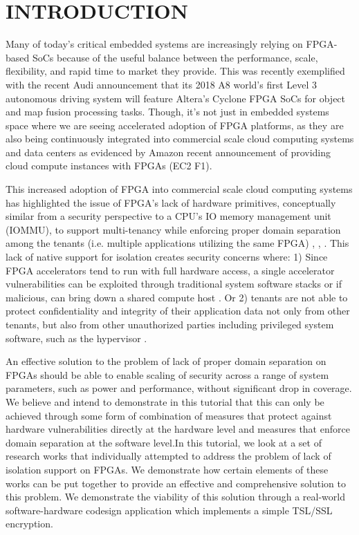 \documentclass[sigconf]{acmart}
\theoremstyle{plain}
\theoremstyle{remark}
\begin{document}
\maketitle


\section{INTRODUCTION}\label{sec:intro}
Many of today's critical embedded systems are increasingly relying on FPGA-based SoCs because of the useful balance between the performance, scale, flexibility, and rapid time to market they provide. This was recently exemplified with the recent Audi announcement that its 2018 A8 world's first Level 3 autonomous driving system will feature Altera's Cyclone FPGA SoCs for object and map fusion processing tasks. Though, it's not just in embedded systems space where we are seeing accelerated adoption of FPGA platforms, as they are also being continuously integrated into commercial scale cloud computing systems and data centers as evidenced by Amazon recent announcement of providing cloud compute instances with FPGAs (EC2 F1).

This increased adoption of FPGA into commercial scale cloud computing systems has highlighted the issue of FPGA's lack of hardware primitives, conceptually similar from a security perspective to a CPU's IO memory management unit (IOMMU), to support multi-tenancy while enforcing proper domain separation among the tenants (i.e. multiple applications utilizing the same FPGA) \cite{CloudFPGA}, \cite{CapslHOST}, \cite{Byma2014FPGAsIT}. This lack of native support for isolation creates security concerns where: 1) Since FPGA accelerators tend to run with full hardware access, a single accelerator vulnerabilities can be exploited through traditional system software stacks or if malicious, can bring down a shared compute host \cite{CloudFPGA}. Or 2) tenants are not able to protect confidentiality and integrity of their application  data not only from other tenants, but also from other unauthorized parties including privileged system software, such as the hypervisor \cite{sconee}.

An effective solution to the problem of lack of proper domain separation on FPGAs should be able to enable scaling of security across a range of system parameters, such as power and performance, without significant drop in coverage. We believe and intend to demonstrate in this tutorial that this can only be achieved through some form of combination of measures that protect against hardware vulnerabilities directly at the hardware level and measures that enforce domain separation at the software level.In this tutorial, we look at a set of  research works that individually attempted to address the problem of lack of isolation support on FPGAs. We demonstrate how certain elements of these works can be put together to provide an effective and comprehensive solution to this problem. We demonstrate the viability of this solution through a real-world software-hardware codesign application which implements a simple TSL/SSL encryption. 
\end{document}
